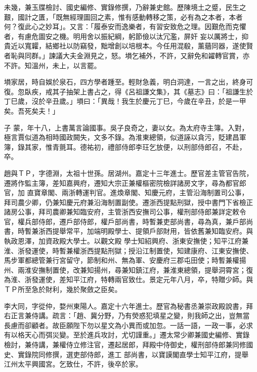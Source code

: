 \begin{pinyinscope}
 未幾，兼玉牒檢討、國史編修、實錄修撰，乃辭兼史館。歷陳境土之蹙，民生之艱，國計之匱，「既無經理圖回之素，惟有感動轉移之策，必有為之本者，本者何？復此心之妙耳」。又言：「履泰安而逸樂者，有習安致危之理。因艱危而克懼者，有慮危圖安之機。明用舍以振紀綱，躬節儉以汰冗濫，屏奸
 妄以厲將士，抑貴近以寬糶，結鄉社以防竊發，黜增創以培根本。今任用混殽，薰蕕同器，遂使賢者恥與同群。」諫議大夫金淵見之，怒。塤乞補外，不許，又辭免和糴轉官賞，亦不許。知溫州，未上，以言罷。



 塤家居，時自娛於泉石，四方學者踵至。輕財急義，明白洞達，一言之出，終身可復。忽臥疾，戒其子抽架上書占之，得《呂祖謙文集》，其《墓志》曰：「祖謙生於丁巳歲，沒於辛丑歲。」塤曰：「異哉！我生於慶元丁巳，今歲在辛丑，於是一甲矣。吾死矣夫！」



 子
 蒙，年十八，上書萬言論國事。吳子良奇之，妻以女。為太府寺主簿。入對，極言賈似道為相時國政闕失，文多不錄。為淮東總領，似道誣以貪污，貶建昌軍簿，錄其家，惟青氈耳。德祐初，禮部侍郎李玨乞放便，以刑部侍郎召，不赴，卒。



 趙與ＴＰ，字德淵，太祖十世孫。居湖州。嘉定十三年進士。歷官差主管官告院，遷將作監主簿，差知嘉興府，遷知大宗正兼權樞密院檢詳諸房文字，尋為都官郎官，加
 直寶章閣、兩浙轉運判官。進煥章閣、知慶元府，主管沿海制置司公事，拜司農少卿，仍兼知慶元府兼沿海制置副使。遷浙西提點刑獄，授中書門下省檢正諸房公事，拜司農卿兼知臨安府，主管浙西安撫司公事，權刑部侍郎兼詳定敕令官，權兵部侍郎，遷戶部侍郎，權戶部尚書，時暫兼吏部尚書，尋為真，兼戶部尚書，時暫兼浙西提舉常平，加端明殿學士、提領戶部財用，皆依舊兼知臨安府。與執政恩澤，加資政殿大學士。以觀文殿
 學士知紹興府、浙東安撫使；知平江府兼淮、浙發運使，時暫兼權浙西提點刑獄；授沿江制置使，知建康府、江東安撫使、馬步軍都總管兼行宮留守，節制和州、無為軍、安慶府三郡屯田使；時暫兼權揚州、兩淮安撫制置使，改兼知揚州，尋兼知鎮江府，兼淮東總領，提舉洞霄宮；復為淮、浙發運使，差知平江府，特轉兩官致仕。景定元年八月，卒，特贈少師。與ＴＰ所至急於財利，幾於聚斂之臣矣。



 李大同，字從仲，婺州東陽人。嘉定十六年進士。歷官為秘書丞兼崇政殿說書，拜右正言兼侍講。疏言：「趙、冀分野，乃有熒惑犯填星之變，則我師之出，豈無當長慮而卻顧者。故臣願陛下勿以星文為小異而或加忽。一話一語，一政一事，必求有以格天心而弭災變。至於進兵攻討，尤切謹重。」遷太常少卿兼國史編修、實錄檢討，兼侍講，兼權侍立修注官，遷起居郎，拜殿中侍御史，權刑部侍郎兼同修國史、實錄院同修撰，選吏部侍郎，進工
 部尚書，以寶謨閣直學士知平江府，提舉江州太平興國宮。乞致仕，不許，後卒於家。




\end{pinyinscope}

